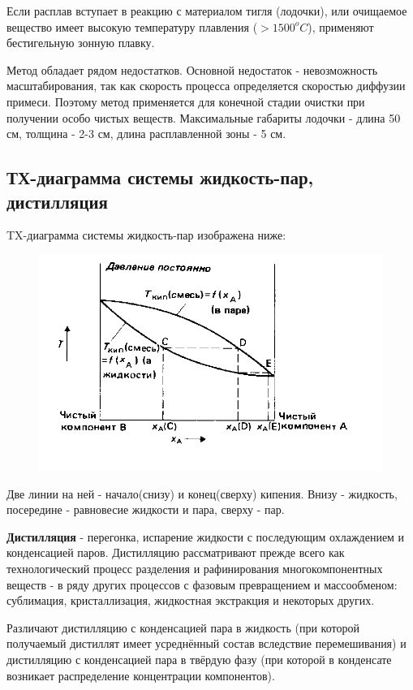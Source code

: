 \documentclass[14pt,a4paper]{scrartcl}
\begin{document}
Если расплав вступает в реакцию с материалом тигля (лодочки), или очищаемое вещество имеет высокую температуру плавления ($>1500^o C$), применяют бестигельную зонную плавку.

Метод обладает рядом недостатков. Основной недостаток - невозможность масштабирования, так как скорость процесса определяется скоростью диффузии примеси. Поэтому метод применяется для конечной стадии очистки при получении особо чистых веществ. Максимальные габариты лодочки - длина 50 см, толщина - 2-3 см, длина расплавленной зоны - 5 см.
\subsection*{ТХ-диаграмма системы жидкость-пар, дистилляция}
TX-диаграмма системы жидкость-пар изображена ниже:
\begin{figure}[H]
\centering
\includegraphics[scale=1.50]{vapor-diagram.png}
\caption{}
\label{}
\end{figure}

Две линии на ней - начало(снизу) и конец(сверху) кипения. Внизу - жидкость, посередине - равновесие жидкости и пара, сверху - пар. 

\textbf{Дистилляция} - перегонка, испарение жидкости с последующим охлаждением и конденсацией паров. Дистилляцию рассматривают прежде всего как технологический процесс разделения и рафинирования многокомпонентных веществ - в ряду других процессов с фазовым превращением и массообменом: сублимация, кристаллизация, жидкостная экстракция и некоторых других. 

Различают дистилляцию с конденсацией пара в жидкость (при которой получаемый дистиллят имеет усреднённый состав вследствие перемешивания) и дистилляцию с конденсацией пара в твёрдую фазу (при которой в конденсате возникает распределение концентрации компонентов). 
\end{document}
